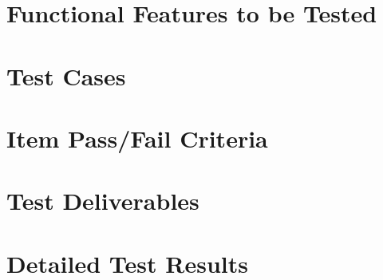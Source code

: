 \documentclass[a4paper,12pt]{article}
\begin{document}
	\section{Functional Features to be Tested}	
		
	
	
	
	\section{Test Cases}	
		
	
	
	
	\section{Item Pass/Fail Criteria}	
	
	
	
	
	\section{Test Deliverables}	 
		

	
	
	
	\section{Detailed Test Results}	 
		
	
	
	
\end{document}
